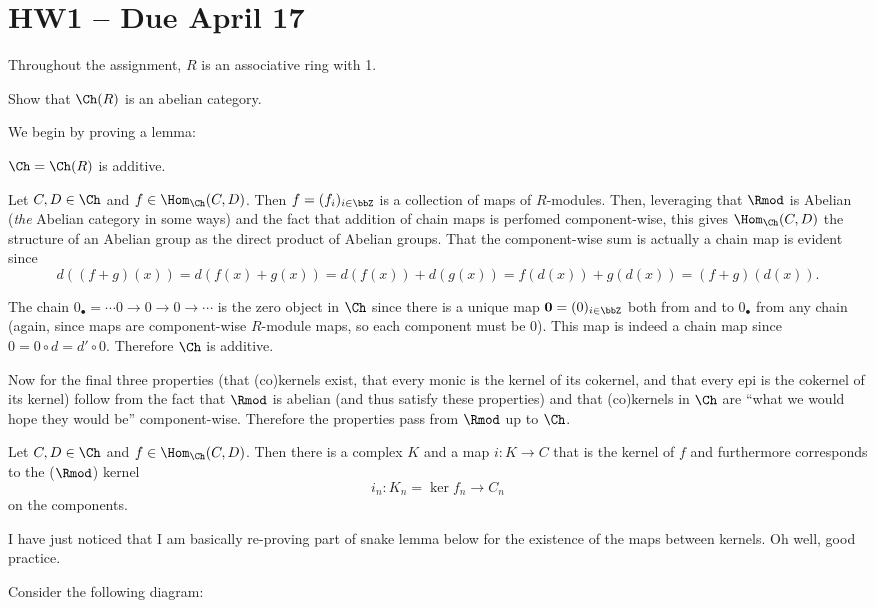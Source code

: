 \documentclass[12pt]{article}
\begin{document}
\newpage
\section{HW1 -- Due April 17}
Throughout the assignment, $R$ is an associative ring with 1.
\begin{prob}
	Show that $\Ch(R)$ is an abelian category.
\end{prob}
\begin{sol}
	We begin by proving a lemma:
	\begin{lem}\label{lem-chain-additive} 
		$\Ch=\Ch(R)$ is additive. 
	\end{lem}
	\begin{prf}
		Let $C,D\in\Ch$ and $f\in\Hom_{\Ch}(C,D)$. Then 
		$f=(f_i)_{i\in\bbZ}$ is a collection of maps of $R$-modules. Then, leveraging that $\Rmod$ is Abelian
		(\textit{the} Abelian category in some ways) and the fact that addition of chain maps is perfomed 
		component-wise, this gives $\Hom_{\Ch}(C,D)$ the structure of an Abelian group as the direct product
		of Abelian groups. That the component-wise sum is actually a chain map is evident since 
		\[d((f+g)(x))=d(f(x)+g(x))=d(f(x))+d(g(x))=f(d(x))+g(d(x))=(f+g)(d(x)).\]

		The chain $0_\bullet=\cdots 0 \to 0\to 0\to \cdots$ is the zero object in $\Ch$ since there is a 
		unique map $\mathbf{0}=(0)_{i\in\bbZ}$ both from and to $0_\bullet$ from any chain (again, since maps
		are component-wise $R$-module maps, so each component must be $0$). This map is indeed a chain map
		since $0=0\circ d=d'\circ 0$. Therefore $\Ch$ is additive.
	\end{prf}

	\brk

	Now for the final three properties (that (co)kernels exist, that every monic is the kernel of its cokernel,
	and that every epi is the cokernel of its kernel) follow from the fact that $\Rmod$ is abelian (and thus satisfy
	these properties) and that (co)kernels in $\Ch$ are ``what we would hope they would be'' component-wise. 
	Therefore the properties pass from $\Rmod$ up to $\Ch$.

	\begin{lem}\label{lem-chain-ker}
		Let $C,D\in\Ch$ and $f\in\Hom_{\Ch}(C,D)$. Then there is a complex $K$ and a map $i:K\to C$ 
		that is the kernel of $f$ and furthermore corresponds to the ($\Rmod$) kernel 
		\[i_n:K_n=\ker f_n\to C_n\]
		on the components.
	\end{lem}
	\begin{prf}
		\begin{rmk}
		I have just noticed that I am basically re-proving part of snake lemma below for the existence of the maps between
		kernels. Oh well, good practice.
		\end{rmk}
		Consider the following diagram:


\end{prf}
\end{sol}
\end{document}
